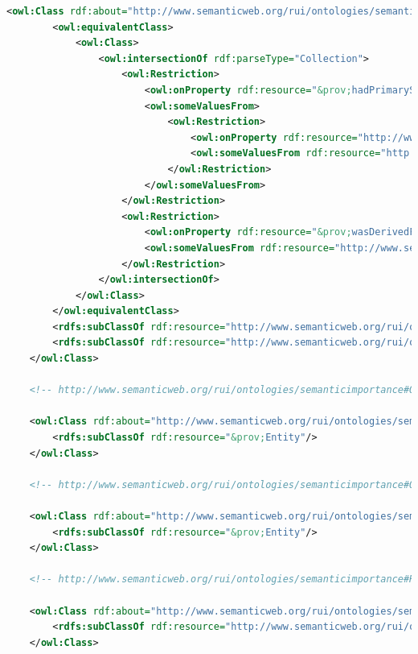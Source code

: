 \begin{lstlisting}[language=XML,caption={Semantic Importance Ontology File (update this file)}]
    <owl:Class rdf:about="http://www.semanticweb.org/rui/ontologies/semanticimportance#QueryRelevance">
        <owl:equivalentClass>
            <owl:Class>
                <owl:intersectionOf rdf:parseType="Collection">
                    <owl:Restriction>
                        <owl:onProperty rdf:resource="&prov;hadPrimarySource"/>
                        <owl:someValuesFrom>
                            <owl:Restriction>
                                <owl:onProperty rdf:resource="http://www.semanticweb.org/rui/ontologies/semanticimportance#isRelevantTo"/>
                                <owl:someValuesFrom rdf:resource="http://www.semanticweb.org/rui/ontologies/semanticimportance#Query"/>
                            </owl:Restriction>
                        </owl:someValuesFrom>
                    </owl:Restriction>
                    <owl:Restriction>
                        <owl:onProperty rdf:resource="&prov;wasDerivedFrom"/>
                        <owl:someValuesFrom rdf:resource="http://www.semanticweb.org/rui/ontologies/semanticimportance#QueryRelevanceOntology"/>
                    </owl:Restriction>
                </owl:intersectionOf>
            </owl:Class>
        </owl:equivalentClass>
        <rdfs:subClassOf rdf:resource="http://www.semanticweb.org/rui/ontologies/semanticimportance#QueryParticipationRecency"/>
        <rdfs:subClassOf rdf:resource="http://www.semanticweb.org/rui/ontologies/semanticimportance#SemanticImportance"/>
    </owl:Class>

    <!-- http://www.semanticweb.org/rui/ontologies/semanticimportance#QueryRelevanceOntology -->

    <owl:Class rdf:about="http://www.semanticweb.org/rui/ontologies/semanticimportance#QueryRelevanceOntology">
        <rdfs:subClassOf rdf:resource="&prov;Entity"/>
    </owl:Class>

    <!-- http://www.semanticweb.org/rui/ontologies/semanticimportance#QueryResult -->

    <owl:Class rdf:about="http://www.semanticweb.org/rui/ontologies/semanticimportance#QueryResult">
        <rdfs:subClassOf rdf:resource="&prov;Entity"/>
    </owl:Class>

    <!-- http://www.semanticweb.org/rui/ontologies/semanticimportance#RecencyTimestamp -->

    <owl:Class rdf:about="http://www.semanticweb.org/rui/ontologies/semanticimportance#RecencyTimestamp">
        <rdfs:subClassOf rdf:resource="http://www.semanticweb.org/rui/ontologies/semanticimportance#TemporalProvenance"/>
    </owl:Class>


\end{lstlisting}
